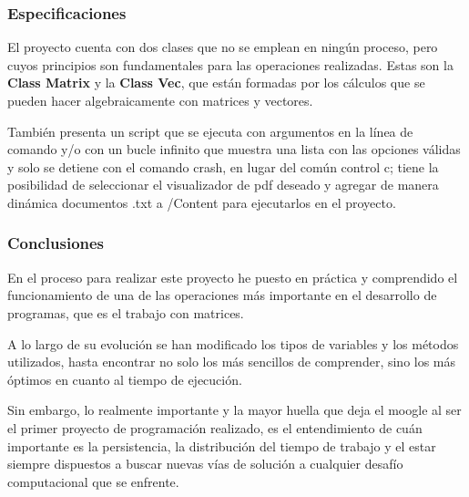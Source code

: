 \documentclass{beamer}
\begin{document}
\begin{frame}
    \frametitle{Especificaciones}
    El proyecto cuenta con dos clases que no se emplean en ningún proceso, pero cuyos principios son 
    fundamentales para las operaciones realizadas. Estas son la \textbf{Class Matrix} y  la \textbf{Class Vec},  que 
    están formadas por los cálculos que se pueden hacer algebraicamente con matrices y vectores.

    También presenta un script que se ejecuta con argumentos en la línea de comando y/o con un bucle infinito que muestra 
    una lista con las opciones válidas y solo se detiene con el comando crash, en lugar del común control c; tiene la 
    posibilidad de seleccionar el visualizador de pdf deseado y agregar de manera dinámica documentos .txt a /Content para 
    ejecutarlos en el proyecto.
\end{frame}

\begin{frame}
    \frametitle{Conclusiones}
    En el proceso para realizar este proyecto he puesto en práctica y comprendido el funcionamiento de una de las 
    operaciones más importante en el desarrollo de programas, que es el trabajo con matrices. 
    
    A lo largo de su evolución se han modificado los tipos de variables y los métodos utilizados, hasta encontrar no 
    solo los más sencillos de comprender, sino los más óptimos en cuanto al tiempo de ejecución.

    Sin embargo, lo realmente importante y la mayor huella que deja el moogle al ser el primer proyecto de programación 
    realizado, es el entendimiento de cuán importante es la persistencia, la distribución del tiempo de trabajo y el 
    estar siempre dispuestos a buscar nuevas vías de solución a cualquier desafío computacional que se enfrente.
\end{frame}
\end{document}
